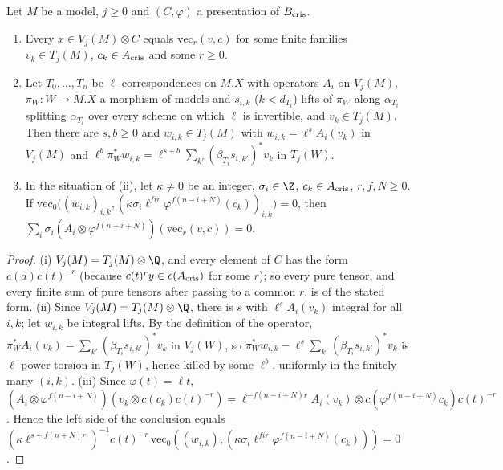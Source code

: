 \begin{lemma}\label{pf:steps1:latexp}
Let $M$ be a model, $j\ge0$ and $(C,\varphi)$ a presentation of $B_{\mathrm{cris}}$.
\begin{enumerate}[label=\textup{(\roman*)},nosep]
\item Every $x\in V_j(M)\otimes C$ equals $\mathrm{vec}_r(v,c)$ for some finite families $v_k\in T_j(M)$, $c_k\in A_{\mathrm{cris}}$ and
  some $r\ge0$.
\item Let $T_0,\dots,T_n$ be $\ell$-correspondences on $M.X$ with operators $A_i$ on $V_j(M)$, $\pi_W\colon W\to M.X$ a morphism of
  models and $s_{i,k}$ ($k<d_{T_i}$) lifts of $\pi_W$ along $\alpha_{T_i}$ splitting $\alpha_{T_i}$ over every scheme on which $\ell$
  is invertible, and $v_k\in T_j(M)$. Then there are $s,b\ge0$ and $w_{i,k}\in T_j(M)$ with $w_{i,k}=\ell^sA_i(v_k)$ in $V_j(M)$ and
  $\ell^b\pi_W^*w_{i,k}=\ell^{s+b}\sum_{k'}(\beta_{T_i}s_{i,k'})^*v_k$ in $T_j(W)$.
\item In the situation of \textup{(ii)}, let $\kappa\ne0$ be an integer, $\sigma_i\in\Z$, $c_k\in A_{\mathrm{cris}}$, $r,f,N\ge0$. If
  $\mathrm{vec}_0\bigl((w_{i,k})_{i,k},(\kappa\sigma_i\ell^{fir}\varphi^{f(n-i+N)}(c_k))_{i,k}\bigr)=0$, then
  $\sum_i\sigma_i(A_i\otimes\varphi^{f(n-i+N)})(\mathrm{vec}_r(v,c))=0$.
\end{enumerate}
\end{lemma}

\begin{proof}
(i) $V_j(M)=T_j(M)\otimes\Q$, and every element of $C$ has the form $c(a)c(t)^{-r}$ (because $c(t)^ry\in c(A_{\mathrm{cris}})$ for some
$r$); so every pure tensor, and every finite sum of pure tensors after passing to a common $r$, is of the stated form.
(ii) Since $V_j(M)=T_j(M)\otimes\Q$, there is $s$ with $\ell^sA_i(v_k)$ integral for all $i,k$; let $w_{i,k}$ be integral lifts.
By the definition of the operator, $\pi_W^*A_i(v_k)=\sum_{k'}(\beta_{T_i}s_{i,k'})^*v_k$ in $V_j(W)$, so
$\pi_W^*w_{i,k}-\ell^s\sum_{k'}(\beta_{T_i}s_{i,k'})^*v_k$ is $\ell$-power torsion in $T_j(W)$, hence killed by some $\ell^b$, uniformly in the
finitely many $(i,k)$.
(iii) Since $\varphi(t)=\ell t$, $(A_i\otimes\varphi^{f(n-i+N)})(v_k\otimes c(c_k)c(t)^{-r})=\ell^{-f(n-i+N)r}A_i(v_k)\otimes
c(\varphi^{f(n-i+N)}c_k)c(t)^{-r}$. Hence the left side of the conclusion equals
$(\kappa\ell^{s+f(n+N)r})^{-1}c(t)^{-r}\,\mathrm{vec}_0((w_{i,k}),(\kappa\sigma_i\ell^{fir}\varphi^{f(n-i+N)}(c_k)))=0$.
\end{proof}

